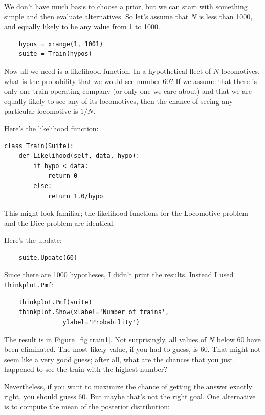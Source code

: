 \documentclass[12pt]{book}
\begin{document}
We don't have much basis to choose a prior, but we can
start with something simple and
then evaluate alternatives.  So let's assume that $N$ is less
than 1000, and equally likely to be any value from 1 to 1000.

\begin{verbatim}
    hypos = xrange(1, 1001)
    suite = Train(hypos)
\end{verbatim}

Now all we need is a likelihood function.  In a hypothetical fleet of
$N$ locomotives, what is the probability that we would see number 60?
If we assume that there is only one train-operating company (or only
one we care about) and that we are equally likely to see any of its
locomotives, then the chance of seeing any particular locomotive is
$1/N$.

Here's the likelihood function:

\begin{verbatim}
class Train(Suite):
    def Likelihood(self, data, hypo):
        if hypo < data:
            return 0
        else:
            return 1.0/hypo
\end{verbatim}

This might look familiar; the likelihood functions for the Locomotive
problem and the Dice problem are identical.

Here's the update:

\begin{verbatim}
    suite.Update(60)
\end{verbatim}

Since there are 1000 hypotheses, I didn't print the results.
Instead I used {\tt thinkplot.Pmf}:

\begin{verbatim}
    thinkplot.Pmf(suite)
    thinkplot.Show(xlabel='Number of trains',
                ylabel='Probability')
\end{verbatim}

The result is in Figure~\ref{fig.train1}.  Not surprisingly, all
values of $N$ below 60 have been eliminated.  The most likely
value, if you had to guess, is 60.  That might not seem like
a very good guess; after all, what are the chances that you just
happened to see the train with the highest number?

Nevertheless, if you want to maximize the chance of getting
the answer exactly right, you should guess 60.  But maybe that's
not the right goal.  One alternative is to compute the
mean of the posterior distribution:
\end{document}
